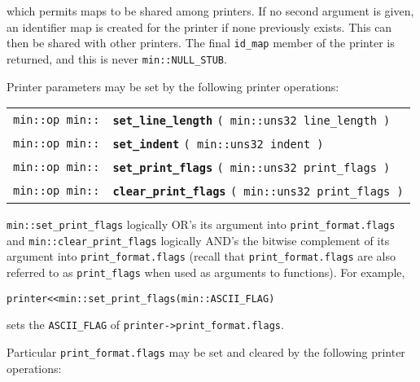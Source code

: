 \documentclass[12pt]{article}
\makeatletter
\newcommand{\ttindex}[1]{\index{#1@{\tt #1}}}
\newcommand{\minindex}[1]{\ttindex{min::#1}\ttindex{#1}}
\newcommand{\EOL}{\penalty \exhyphenpenalty}
\newenvironment{indpar}[1][0.3in]%
	{\begin{list}{}%
		     {\setlength{\itemsep}{0in}%
		      \setlength{\topsep}{0in}%
		      \setlength{\parsep}{1ex}%
		      \setlength{\labelwidth}{#1}%
		      \setlength{\leftmargin}{#1}%
		      \addtolength{\leftmargin}{\labelsep}}%
	 \item}%
	{\end{list}}
\newcommand{\LABEL}[1]{\label{#1}}
\newcommand{\MINKEY}[1]{{\tt \bf #1}\minindex{#1}}
\makeatother
\begin{document}
which permits maps to be shared among printers.  If no second argument
is given, an identifier map is created for the printer if none previously
exists.  This can then be shared with other printers.  The final
{\tt id\_\EOL map} member of the printer is returned, and this
is never {\tt min::\EOL NULL\_\EOL STUB}.

Printer parameters may be set
by the following printer operations:

\begin{indpar}[1em]\begin{tabular}{r@{}l}
\verb|min::op min::|
    & \MINKEY{set\_\EOL line\_length} \verb|( min::uns32 line_length )|
\LABEL{MIN::SET_LINE_LENGTH} \\
\verb|min::op min::|
    & \MINKEY{set\_\EOL indent} \verb|( min::uns32 indent )|
\LABEL{MIN::SET_INDENT} \\
\verb|min::op min::|
    & \MINKEY{set\_print\_flags} \verb|( min::uns32 print_flags )|
\LABEL{MIN::SET_PRINT_FLAGS} \\
\verb|min::op min::|
    & \MINKEY{clear\_print\_flags} \verb|( min::uns32 print_flags )|
\LABEL{MIN::CLEAR_PRINT_FLAGS} \\
\end{tabular}\end{indpar}

{\tt min::\EOL set\_\EOL print\_\EOL flags} logically OR's
its argument into {\tt print\_\EOL format.flags} and
{\tt min::\EOL clear\_\EOL print\_\EOL flags} logically AND's
the bitwise complement of its argument into {\tt print\_\EOL format.flags}
(recall that {\tt print\_\EOL format.flags} are also referred to as
{\tt print\_\EOL flags} when used as arguments to functions).
For example, 
\begin{center}
\tt printer<{}<min::set\_print\_flags(min::ASCII\_FLAG)
\end{center}
sets the {\tt ASCII\_FLAG} of {\tt printer->\EOL print\_\EOL format.flags}.

Particular {\tt print\_format.flags} may be set and cleared by the
following printer operations:
\end{document}
